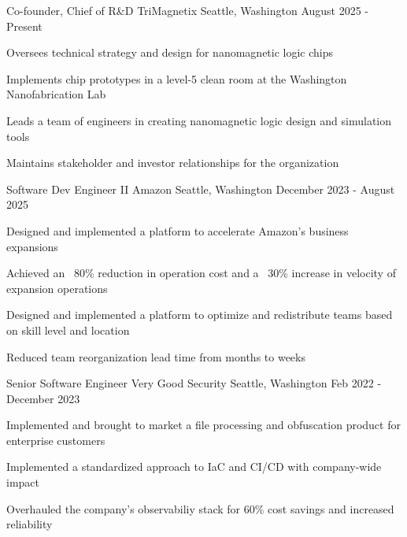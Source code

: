 


\begin{cventries}

\cventry
{Co-founder, Chief of R\&D} %
{TriMagnetix} %
{Seattle, Washington} %
{August 2025 - Present} %
{ %
\begin{cvitems}
\item{Oversees technical strategy and design for nanomagnetic logic chips}
\item{Implements chip prototypes in a level-5 clean room at the Washington Nanofabrication Lab}
\item{Leads a team of engineers in creating nanomagnetic logic design and simulation tools}
\item{Maintains stakeholder and investor relationships for the organization}
\end{cvitems}
}

\cventry
{Software Dev Engineer II} %
{Amazon} %
{Seattle, Washington} %
{December 2023 - August 2025} %
{ %
\begin{cvitems}
\item{Designed and implemented a platform to accelerate Amazon's business expansions}
\item{Achieved an ~80\% reduction in operation cost and a ~30\% increase in velocity of expansion operations}
\item{Designed and implemented a platform to optimize and redistribute teams based on skill level and location}
\item{Reduced team reorganization lead time from months to weeks}
\end{cvitems}
}

\cventry
{Senior Software Engineer} %
{Very Good Security} %
{Seattle, Washington} %
{Feb 2022 - December 2023} %
{ %
\begin{cvitems}
\item{Implemented and brought to market a file processing and obfuscation product for enterprise customers}
\item{Implemented a standardized approach to IaC and CI/CD with company-wide impact}
\item{Overhauled the company's observabiliy stack for 60\% cost savings and increased reliability}
\end{cvitems}
}



\end{cventries}
